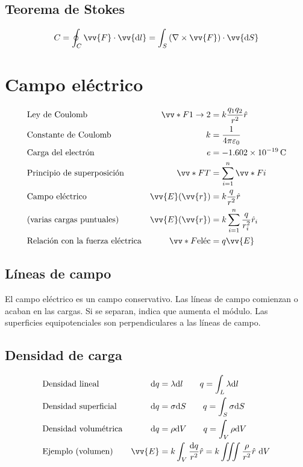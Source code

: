 \documentclass[a4paper, 8pt]{extarticle}
\renewcommand{\vec}[1]{\vv{{#1}}}
\renewcommand{\grad}{\nabla}
\begin{document}
\begin{multicols}{3}
  \subsection{Teorema de Stokes}
  \[ C = \oint _C \vec{F}\cdot \vec{\dd l} = \int_{S} \left( \grad \times \vec{F} \right) \cdot \vec{\dd S} \]

  \newpage
  \section{Campo eléctrico}
  \begin{align*}
     & \textnormal{Ley de Coulomb}             & \vv*{F}{1\to 2}      & = k \frac{q_1q_2}{r^2} \hat{r}             \\
     & \textnormal{Constante de Coulomb}       & k                    & = \frac{1}{4\pi\varepsilon_0}              \\
     & \textnormal{Carga del electrón}         & e                    & = \SI{-1.602e-19}{\coulomb}                \\
     & \text{Principio de superposición}       & \vv*{F}{T}           & = \sum_{i=1}^{n} \vv*{F}{i}                \\
     & \text{Campo eléctrico}                  & \vec{E} (\vec{r})    & = k \frac{q}{r^2}\hat{r}                   \\
     & \text{(varias cargas puntuales)}        & \vec{E} (\vec{r})    & = k \sum_{i=1}^{n}\frac{q}{r_i^2}\hat{r}_i \\
     & \text{Relación con la fuerza eléctrica} & \vv*{F}{\text{eléc}} & = q \vec{E}                                \\
  \end{align*}

  \subsection{Líneas de campo}
  El campo eléctrico es un campo conservativo. Las líneas de campo comienzan o acaban en las cargas. Si se separan, indica que aumenta el módulo. Las superficies equipotenciales son perpendiculares a las líneas de campo.

  \subsection{Densidad de carga}
  \begin{align*}
     & \text{Densidad lineal}      & \dd q   & = \lambda \dd l \qquad q = \int_{L} \lambda \dd l                                \\
     & \text{Densidad superficial} & \dd q   & = \sigma \dd S \qquad q = \int_{S} \sigma \dd S                                  \\
     & \text{Densidad volumétrica} & \dd q   & = \rho \dd V \qquad q = \int_{V} \rho \dd
    V                                                                                                                           \\
     & \text{Ejemplo (volumen)}    & \vec{E} & = k \int_{V}\frac{\dd q}{r^2}\hat{r} = k \iiint \frac{\rho}{r^2} \hat{r} \ \dd V
  \end{align*}


\end{multicols}
\end{document}
